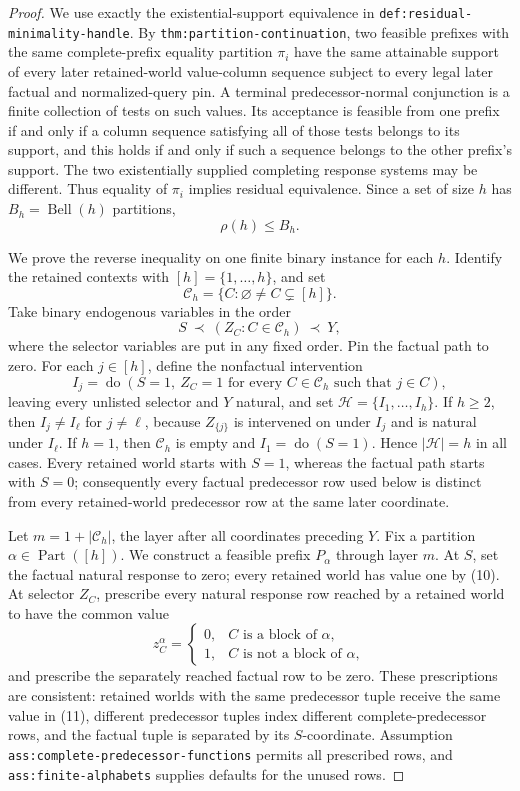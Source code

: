 \documentclass{article}
\begin{document}
\begin{proof}
We use exactly the existential-support equivalence in \texttt{def:residual-minimality-handle}.  By \texttt{thm:partition-continuation}, two feasible prefixes with the same complete-prefix equality partition \(\pi_i\) have the same attainable support of every later retained-world value-column sequence subject to every legal later factual and normalized-query pin.  A terminal predecessor-normal conjunction is a finite collection of tests on such values.  Its acceptance is feasible from one prefix if and only if a column sequence satisfying all of those tests belongs to its support, and this holds if and only if such a sequence belongs to the other prefix's support.  The two existentially supplied completing response systems may be different.  Thus equality of \(\pi_i\) implies residual equivalence.  Since a set of size \(h\) has \(B_h=\operatorname{Bell}(h)\) partitions,
\[
 \rho(h)\leq B_h.
\tag{8}
\]

We prove the reverse inequality on one finite binary instance for each \(h\).  Identify the retained contexts with \([h]=\{1,\ldots,h\}\), and set
\[
 \mathscr C_h=\{C:\varnothing\neq C\subsetneq[h]\}.
\]
Take binary endogenous variables in the order
\[
 S\ \prec\ (Z_C:C\in\mathscr C_h)\ \prec\ Y,
\tag{9}
\]
where the selector variables are put in any fixed order.  Pin the factual path to zero.  For each \(j\in[h]\), define the nonfactual intervention
\[
 I_j=\operatorname{do}\!\left(S=1,\ Z_C=1\text{ for every }C\in\mathscr C_h\text{ such that }j\in C\right),
\tag{10}
\]
leaving every unlisted selector and \(Y\) natural, and set \(\mathcal H=\{I_1,\ldots,I_h\}\).  If \(h\geq2\), then \(I_j\neq I_\ell\) for \(j\neq\ell\), because \(Z_{\{j\}}\) is intervened on under \(I_j\) and is natural under \(I_\ell\).  If \(h=1\), then \(\mathscr C_h\) is empty and \(I_1=\operatorname{do}(S=1)\).  Hence \(|\mathcal H|=h\) in all cases.  Every retained world starts with \(S=1\), whereas the factual path starts with \(S=0\); consequently every factual predecessor row used below is distinct from every retained-world predecessor row at the same later coordinate.

Let \(m=1+|\mathscr C_h|\), the layer after all coordinates preceding \(Y\).  Fix a partition \(\alpha\in\operatorname{Part}([h])\).  We construct a feasible prefix \(P_\alpha\) through layer \(m\).  At \(S\), set the factual natural response to zero; every retained world has value one by (10).  At selector \(Z_C\), prescribe every natural response row reached by a retained world to have the common value
\[
 z_C^\alpha=
 \begin{cases}
 0,&C\text{ is a block of }\alpha,\\
 1,&C\text{ is not a block of }\alpha,
 \end{cases}
\tag{11}
\]
and prescribe the separately reached factual row to be zero.  These prescriptions are consistent: retained worlds with the same predecessor tuple receive the same value in (11), different predecessor tuples index different complete-predecessor rows, and the factual tuple is separated by its \(S\)-coordinate.  Assumption \texttt{ass:complete-predecessor-functions} permits all prescribed rows, and \texttt{ass:finite-alphabets} supplies defaults for the unused rows.


\end{proof}
\end{document}

